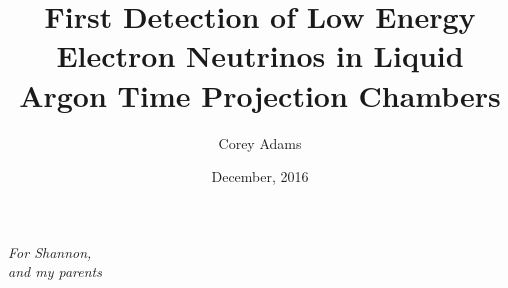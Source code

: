 


\title{First Detection of Low Energy Electron Neutrinos in Liquid Argon Time Projection Chambers}
\author{Corey Adams}
\date{December, 2016} %

\frontmatter



\maketitle


\newpage \vspace*{8cm}
\thispagestyle{empty}
\begin{center}
  \Large \emph{For Shannon, \\ and my parents}
\end{center}





\tableofcontents
\listoffigures %
\listoftables %